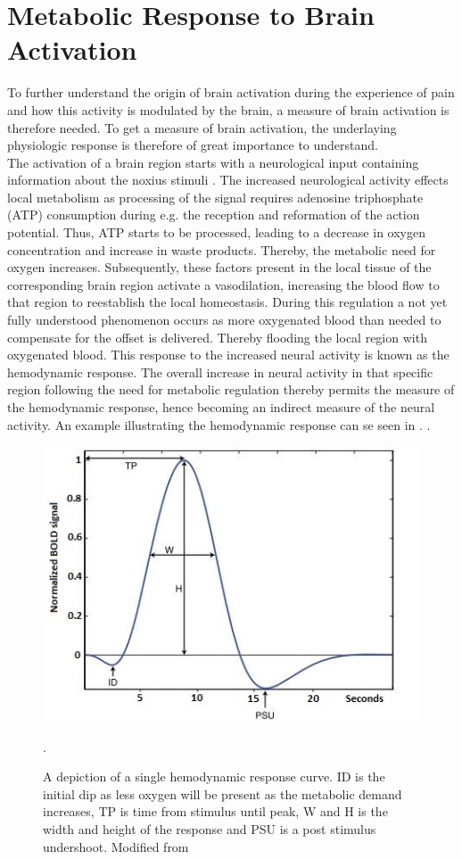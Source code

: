 
\section{Metabolic Response to Brain Activation} \label{sec:pain}

To further understand the origin of brain activation during the experience of pain and how this activity is modulated by the brain, a measure of brain activation is therefore needed. To get a measure of brain activation, the underlaying physiologic response is therefore of great importance to understand. \\
The activation of a brain region starts with a neurological input containing information about the noxius stimuli \cite{Tracey2007}. The increased neurological activity effects local metabolism as processing of the signal requires adenosine triphosphate (ATP) consumption during e.g. the reception and reformation of the action potential. Thus, ATP starts to be processed, leading to a decrease in oxygen concentration and increase in waste products. Thereby, the metabolic need for oxygen increases. Subsequently, these factors present in the local tissue of the corresponding brain region activate a vasodilation, increasing the blood flow to that region to reestablish the local homeostasis. During this regulation a not yet fully understood phenomenon occurs as more oxygenated blood than needed to compensate for the offset is delivered. Thereby flooding the local region with oxygenated blood. This response to the increased neural activity is known as the hemodynamic response. The overall increase in neural activity in that specific region following the need for metabolic regulation thereby permits the measure of the hemodynamic response, hence becoming an indirect measure of the neural activity. An example illustrating the hemodynamic response can se seen in . \cite{Glover2011,Poldrack2011}.

\begin{figure}[H]                 
	\includegraphics[width=.48\textwidth]{figures/aBackground/HRF}  
	\caption{A depiction of a single hemodynamic response curve. ID is the initial dip as less oxygen will be present as the metabolic demand increases, TP is time from stimulus until peak, W and H is the width and height of the response and PSU is a post stimulus undershoot. Modified from \cite{Poldrack2011}}.
	\label{fig:back:HRF} 
\end{figure}

